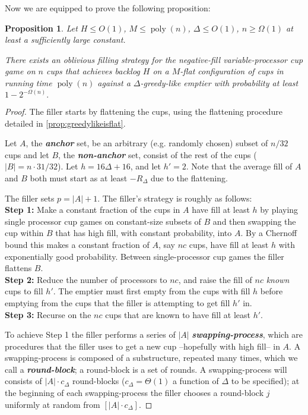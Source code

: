 \documentclass[twocolumn]{article}[10pt]
\newcommand{\defn}[1]{{\textit{\textbf{\boldmath #1}}}\xspace}
\DeclareMathOperator{\poly}{\text{poly}}
\newtheorem{proposition}{Proposition}
\begin{document}
Now we are equipped to prove the following proposition:
\begin{proposition}
  \label{prop:obliviousBase}
  Let $H \le O(1)$, $M \le \poly(n)$, $\Delta \le O(1)$, $n \ge \Omega(1)$ at
  least a sufficiently large constant. 

  There exists an oblivious filling strategy for the negative-fill
  variable-processor cup game on $n$ cups that achieves backlog $H$ on a
  $M$-flat configuration of cups in running time $\poly(n)$ against a
  $\Delta$-greedy-like emptier with probability at least $1-2^{-\Omega(n)}.$
\end{proposition}
\begin{proof}
  The filler starts by flattening the cups, using the flattening procedure
  detailed in \cref{prop:greedylikeisflat}. 

  Let $A$, the \defn{anchor} set, be an arbitrary (e.g. randomly chosen) subset
  of $n/32$ cups and let $B$, the \defn{non-anchor} set, consist of the rest of
  the cups ($|B| = n\cdot 31/32$). Let $h = 16\Delta + 16$, and let $h' = 2$. Note that
  the average fill of $A$ and $B$ both must start as at least $-R_\Delta$ due
  to the flattening.

  The filler sets $p=|A|+1$. The filler's strategy is roughly as follows: \\
  \textbf{Step 1:} Make a constant fraction of the cups in $A$ have fill at
  least $h$ by playing single processor cup games on constant-size subsets of
  $B$ and then swapping the cup within $B$ that has high fill, with constant
  probability, into $A$. By a Chernoff bound this makes a constant fraction of
  $A$, say $nc$ cups, have fill at least $h$ with exponentially good
  probability. Between single-processor cup games the filler flattens $B$.\\
  \textbf{Step 2:} Reduce the number of processors to $nc$, and raise the fill
  of $nc$ \emph{known} cups to fill $h'$. The emptier must first empty from the
  cups with fill $h$ before emptying from the cups that the filler is
  attempting to get fill $h'$ in.\\
  \textbf{Step 3:} Recurse on the $nc$ cups that are known to have fill at
  least $h'$.

To achieve Step 1 the filler performs a series of $|A|$ \defn{swapping-process},
which are procedures that the filler uses to get a new cup --hopefully with
high fill-- in $A$. A swapping-process is composed of a substructure, repeated
many times, which we call a \defn{round-block}; a round-block is a set of
rounds. A swapping-process will consists of $|A|\cdot c_\Delta$ round-blocks
($c_\Delta = \Theta(1)$ a function of $\Delta$ to be specified); at the beginning
of each swapping-process the filler chooses a round-block $j$ uniformly at
random from $[|A|\cdot c_\Delta]$. 


\end{proof}
\end{document}
